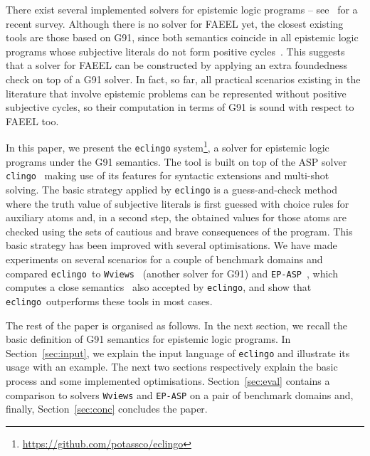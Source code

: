 \documentclass{new_tlp}
\def\eclingo{{\tt eclingo}}
\def\wviews{{\tt Wviews}}
\def\clingo{{\tt clingo}}
\def\wviews{{\tt Wviews}}
\def\EPASP{{\tt EP-ASP}}
\begin{document}
There exist several implemented solvers for epistemic logic programs -- see~\cite{leckah18} for a recent survey.
%
Although there is no solver for FAEEL yet, the closest existing tools are those based on G91, since both semantics coincide in all epistemic logic programs whose subjective literals do not form positive cycles~\cite{fandinno19}.
%
This suggests that a solver for FAEEL can be constructed by applying an extra foundedness check on top of a G91 solver.
%
In fact, so far, all practical scenarios existing in the literature that involve epistemic problems can be represented without positive subjective cycles, so their computation in terms of G91 is sound with respect to FAEEL too.

In this paper, we present the \eclingo{} system\footnote{\url{https://github.com/potassco/eclingo}}, a solver for epistemic logic programs under the G91 semantics.
%
The tool is built on top of the ASP solver \clingo~\cite{gekakasc17a}
making use of its features for syntactic extensions and multi-shot solving.
%
The basic strategy applied by \eclingo{} is a guess-and-check method where the truth value of subjective literals is first guessed with choice rules for auxiliary atoms and, in a second step, the obtained values for those atoms are checked using the sets of cautious and brave consequences of the program.
%
This basic strategy has been improved with several optimisations.
%
We have made experiments on several scenarios for a couple of benchmark domains and compared \eclingo\ to
\wviews~\cite{Kelly07} (another solver for G91) and \EPASP~\cite{SLKL17},
which computes a close semantics~\cite{kawabagezh15} also accepted by \eclingo{},
and show that \eclingo\ outperforms these tools in most cases.

The rest of the paper is organised as follows. 
%
In the next section, we recall the basic definition of G91 semantics for epistemic logic programs.
%
In Section~\ref{sec:input}, we explain the input language of \eclingo{} and illustrate its usage with an example.
%
The next two sections respectively explain the basic process and some implemented optimisations.
%
Section~\ref{sec:eval} contains a comparison to solvers \wviews{} and \EPASP{} on a pair of benchmark domains and, finally, Section~\ref{sec:conc} concludes the paper.



\end{document}
